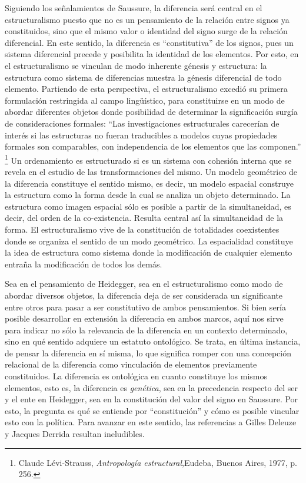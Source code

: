 \documentclass{book}
\begin{document}
Siguiendo los señalamientos de Saussure, la diferencia será central en
el estructuralismo puesto que no es un pensamiento de la relación entre
signos ya constituidos, sino que el mismo valor o identidad del signo
surge de la relación diferencial. En este sentido, la diferencia es
\enquote{constitutiva} de los signos, pues un sistema diferencial precede y
posibilita la identidad de los elementos. Por esto, en el
estructuralismo se vinculan de modo inherente génesis y estructura: la
estructura como sistema de diferencias muestra la génesis diferencial de
todo elemento. Partiendo de esta perspectiva, el estructuralismo excedió
su primera formulación restringida al campo lingüístico, para
constituirse en un modo de abordar diferentes objetos donde posibilidad
de determinar la significación surgía de consideraciones formales: \enquote{Las
investigaciones estructurales carecerían de interés si las estructuras
no fueran traducibles a modelos cuyas propiedades formales son
comparables, con independencia de los elementos que las
componen.} \footnote{Claude Lévi-Strauss, \emph{Antropología
  estructural},Eudeba, Buenos Aires, 1977, p. 256.} Un ordenamiento es
estructurado si es un sistema con cohesión interna que se revela en el
estudio de las transformaciones del mismo. Un modelo geométrico de la
diferencia constituye el sentido mismo, es decir, un modelo espacial
construye la estructura como la forma desde la cual se analiza un objeto
determinado. La estructura como imagen espacial sólo es posible a partir
de la simultaneidad, es decir, del orden de la co-existencia. Resulta
central así la simultaneidad de la forma. El estructuralismo vive de la
constitución de totalidades coexistentes donde se organiza el sentido de
un modo geométrico. La espacialidad constituye la idea de estructura
como sistema donde la modificación de cualquier elemento entraña la
modificación de todos los demás.

Sea en el pensamiento de Heidegger, sea en el estructuralismo como modo
de abordar diversos objetos, la diferencia deja de ser considerada un
significante entre otros para pasar a ser constitutivo de ambos
pensamientos. Si bien sería posible desarrollar en extensión la
diferencia en ambos marcos, aquí nos sirve para indicar no sólo la
relevancia de la diferencia en un contexto determinado, sino en qué
sentido adquiere un estatuto ontológico. Se trata, en última instancia,
de pensar la diferencia en sí misma, lo que significa romper con una
concepción relacional de la diferencia como vinculación de elementos
previamente constituidos. La diferencia es ontológica en cuanto
constituye los mismos elementos, esto es, la diferencia es
\emph{genética}, sea en la precedencia respecto del ser y el ente en
Heidegger, sea en la constitución del valor del signo en Saussure. Por
esto, la pregunta es qué se entiende por \enquote{constitución} y cómo es
posible vincular esto con la política. Para avanzar en este sentido, las
referencias a Gilles Deleuze y Jacques Derrida resultan ineludibles.
\end{document}
